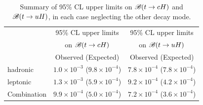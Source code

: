 
\begin{table}[t!]
\caption{\small{Summary of 95\% CL upper limits on $\mathscr{B}(t \to cH)$ and $\mathscr{B}(t \to uH)$, in each case neglecting the other decay mode. }}
\begin{center}
\begin{tabular}{lcc}
\toprule\toprule
 & \multicolumn{1}{c}{95\% CL upper limits} & \multicolumn{1}{c}{95\% CL upper limits}  \\
 & \multicolumn{1}{c}{on $\mathscr{B}(t \to cH)$} & \multicolumn{1}{c}{on $\mathscr{B}(t \to uH)$} \\
 &  Observed (Expected) & Observed (Expected)  \\
\midrule\midrule
hadronic  & $1.0 \times 10^{-3}$ ($9.8 \times 10^{-4}$) & $7.8 \times 10^{-4}$ ($7.8 \times 10^{-4}$) \\ 
leptonic  & $1.3 \times 10^{-3}$ ($5.9 \times 10^{-4}$) & $9.2 \times 10^{-4}$ ($4.2 \times 10^{-4}$) \\
\midrule
Combination  & $9.9 \times 10^{-4}$ ($5.0 \times 10^{-4}$) & $7.2 \times 10^{-4}$ ($3.6 \times 10^{-4}$) \\
\bottomrule\bottomrule
\end{tabular}
\label{tab:limits_summary}
\end{center}
\end{table}

